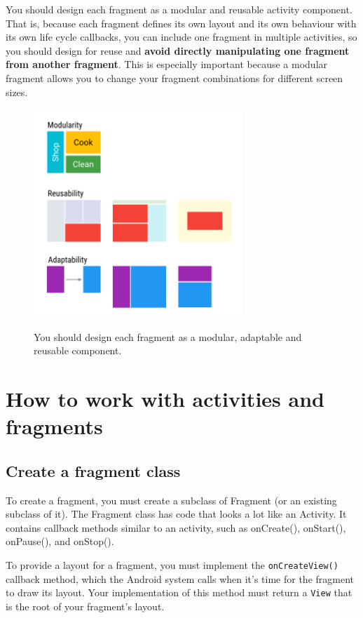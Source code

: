 You should design each fragment as a modular and reusable activity component. That is, because each fragment defines its own layout and its own behaviour with its own life cycle callbacks, you can include one fragment in multiple activities, so you should design for reuse and \textbf{avoid directly manipulating one fragment from another fragment}. This is especially important because a modular fragment allows you to change your fragment combinations for different screen sizes.

\begin{figure}
	\centering
	\includegraphics[width=0.7\textwidth]{images/fragments/framgentswhy.png}
	\label{fig:whyfragments}
	\caption{You should design each fragment as a modular, adaptable and reusable component.}
\end{figure}

\section{How to work with activities and fragments}


\subsection{Create a fragment class}

To create a fragment, you must create a subclass of Fragment (or an existing subclass of it). The Fragment class has code that looks a lot like an Activity. It contains callback methods similar to an activity, such as onCreate(), onStart(), onPause(), and onStop().

To provide a layout for a fragment, you must implement the \texttt{onCreateView()} callback method, which the Android system calls when it's time for the fragment to draw its layout. Your implementation of this method must return a \texttt{View} that is the root of your fragment's layout.


